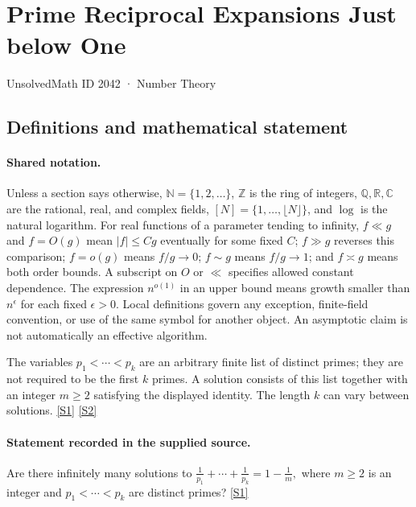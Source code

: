 \documentclass[11pt,a4paper]{article}
\newcommand{\N}{\mathbb{N}}
\newcommand{\Z}{\mathbb{Z}}
\newcommand{\Q}{\mathbb{Q}}
\newcommand{\R}{\mathbb{R}}
\newcommand{\C}{\mathbb{C}}
\newcommand{\sref}[2]{\hyperlink{source:#1:#2}{[S#2]}}
\begin{document}

\setcounter{section}{2041}

\section{Prime Reciprocal Expansions Just below One}\label{2042}

{\small\sffamily UnsolvedMath ID 2042 · Number Theory}

\subsection{Definitions and mathematical statement}

\paragraph{Shared notation.}Unless a section says otherwise, $\N=\{1,2,\ldots\}$,
$\Z$ is the ring of integers, $\Q,\R,\C$ are the rational, real, and complex
fields, $[N]=\{1,\ldots,\lfloor N\rfloor\}$, and $\log$ is the natural
logarithm. For real functions of a parameter tending to infinity,
$f\ll g$ and $f=O(g)$ mean $|f|\leq Cg$ eventually for some fixed $C$;
$f\gg g$ reverses this comparison; $f=o(g)$ means $f/g\to0$;
$f\sim g$ means $f/g\to1$; and $f\asymp g$ means both order bounds.
A subscript on $O$ or $\ll$ specifies allowed constant dependence.
The expression $n^{o(1)}$ in an upper bound means growth smaller than
$n^\epsilon$ for each fixed $\epsilon>0$. Local definitions govern any
exception, finite-field convention, or use of the same symbol for another
object. An asymptotic claim is not automatically an effective algorithm.



The variables $p_1<\cdots<p_k$ are an arbitrary finite list of distinct primes; they are not required to be the first $k$ primes. A solution consists of this list together with an integer $m\geq2$ satisfying the displayed identity. The length $k$ can vary between solutions. \sref{2042}{1} \sref{2042}{2}

\paragraph{Statement recorded in the supplied source.}
Are there infinitely many solutions to $ \frac{1}{p_1}+\cdots+\frac{1}{p_k}=1-\frac{1}{m}, $ where $m\geq 2$ is an integer and $p_1<\cdots<p_k$ are distinct primes? \sref{2042}{1}
\end{document}
